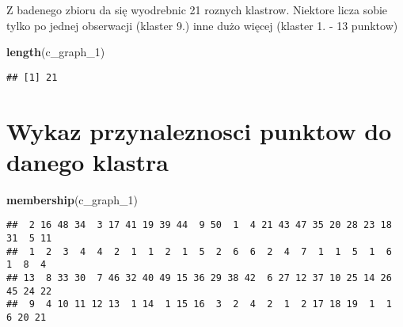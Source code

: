 \documentclass[]{article}
\newenvironment{Shaded}{\begin{snugshade}}{\end{snugshade}}
\newcommand{\KeywordTok}[1]{\textcolor[rgb]{0.13,0.29,0.53}{\textbf{#1}}}
\newcommand{\DecValTok}[1]{\textcolor[rgb]{0.00,0.00,0.81}{#1}}
\newcommand{\NormalTok}[1]{#1}
\begin{document}
Z badenego zbioru da się wyodrebnic 21 roznych klastrow. Niektore licza
sobie tylko po jednej obserwacji (klaster 9.) inne dużo więcej (klaster
1. - 13 punktow)

\begin{Shaded}
\begin{Highlighting}[]
\KeywordTok{length}\NormalTok{(c_graph_}\DecValTok{1}\NormalTok{)}
\end{Highlighting}
\end{Shaded}

\begin{verbatim}
## [1] 21
\end{verbatim}

\section{Wykaz przynaleznosci punktow do danego
klastra}\label{wykaz-przynaleznosci-punktow-do-danego-klastra}

\begin{Shaded}
\begin{Highlighting}[]
\KeywordTok{membership}\NormalTok{(c_graph_}\DecValTok{1}\NormalTok{)}
\end{Highlighting}
\end{Shaded}

\begin{verbatim}
##  2 16 48 34  3 17 41 19 39 44  9 50  1  4 21 43 47 35 20 28 23 18 31  5 11 
##  1  2  3  4  4  2  1  1  2  1  5  2  6  6  2  4  7  1  1  5  1  6  1  8  4 
## 13  8 33 30  7 46 32 40 49 15 36 29 38 42  6 27 12 37 10 25 14 26 45 24 22 
##  9  4 10 11 12 13  1 14  1 15 16  3  2  4  2  1  2 17 18 19  1  1  6 20 21
\end{verbatim}
\end{document}
